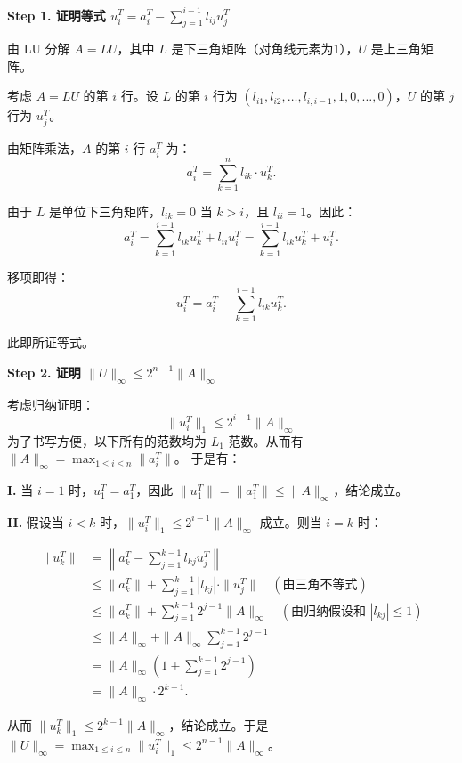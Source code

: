 \documentclass{article}
\begin{document}
\begin{solution}
  \textbf{Step 1. 证明等式 $u_i^T = a_i^T - \sum_{j=1}^{i-1} l_{ij} u_j^T$}

  由 LU 分解 $A = LU$，其中 $L$ 是下三角矩阵（对角线元素为1），$U$ 是上三角矩阵。

  考虑 $A = LU$ 的第 $i$ 行。设 $L$ 的第 $i$ 行为 $(l_{i1}, l_{i2}, \ldots,
  l_{i,i-1}, 1, 0, \ldots, 0)$，$U$ 的第 $j$ 行为 $u_j^T$。

  由矩阵乘法，$A$ 的第 $i$ 行 $a_i^T$ 为：
  \[
    a_i^T = \sum_{k=1}^{n} l_{ik} \cdot u_k^T.
  \]

  由于 $L$ 是单位下三角矩阵，$l_{ik} = 0$ 当 $k > i$，且 $l_{ii} = 1$。因此：
  \[
    a_i^T = \sum_{k=1}^{i-1} l_{ik} u_k^T + l_{ii} u_i^T =
    \sum_{k=1}^{i-1} l_{ik} u_k^T + u_i^T.
  \]

  移项即得：
  \[
    u_i^T = a_i^T - \sum_{k=1}^{i-1} l_{ik} u_k^T.
  \]

  此即所证等式。

  \textbf{Step 2. 证明 $\|U\|_\infty \leq 2^{n-1}\|A\|_\infty$}

  考虑归纳证明：
  \[
    \|u_i^T\|_1 \leq 2^{i-1} \|A\|_\infty
  \]
  为了书写方便，以下所有的范数均为 $L_1$ 范数。从而有 $\|A\|_\infty = \max_{1 \leq i \leq
  n} \|a_i^T\|$。
  于是有：

  \textbf{I.} 当 $i=1$ 时，$u_1^T = a_1^T$，因此 $\|u_1^T\| = \|a_1^T\|
  \leq \|A\|_\infty$，结论成立。

  \textbf{II.} 假设当 $i < k$ 时，$\|u_i^T\|_1 \leq 2^{i-1} \|A\|_\infty$
  成立。则当 $i = k$ 时：

  \[
    \begin{aligned}
      \|u_k^T\| & = \left\| a_k^T - \sum_{j=1}^{k-1} l_{kj} u_j^T
      \right\| \\
      & \leq \|a_k^T\| + \sum_{j=1}^{k-1} |l_{kj}| \cdot \|u_j^T\|
      \quad (\text{由三角不等式}) \\
      & \leq \|a_k^T\| + \sum_{j=1}^{k-1} 2^{j-1} \|A\|_\infty
      \quad (\text{由归纳假设和 $|l_{kj}| \leq 1$}) \\
      & \leq \|A\|_\infty + \|A\|_\infty \sum_{j=1}^{k-1} 2^{j-1} \\
      & = \|A\|_\infty \left( 1 + \sum_{j=1}^{k-1} 2^{j-1} \right) \\
      & = \|A\|_\infty \cdot 2^{k-1}.
    \end{aligned}
  \]

  从而 $\|u_k^T\|_1 \leq 2^{k-1} \|A\|_\infty$，结论成立。于是 $\|U\|_\infty =
  \max_{1 \leq i \leq n} \|u_i^T\|_1 \leq 2^{n-1} \|A\|_\infty$。
\end{solution}
\end{document}
